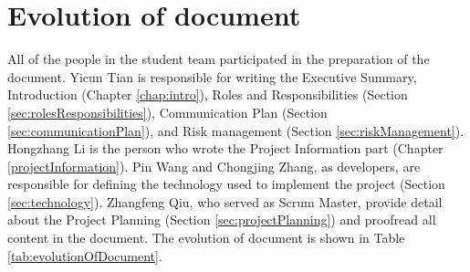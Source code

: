 \section{Evolution of document}
\label{sec:evolutionOfDocument}
All of the people in the student team participated in the preparation of the document. Yicun Tian is responsible for writing the Executive Summary, Introduction (Chapter \ref{chap:intro}), Roles and Responsibilities (Section \ref{sec:rolesResponsibilities}), Communication Plan (Section \ref{sec:communicationPlan}), and Risk management (Section \ref{sec:riskManagement}). Hongzhang Li is the person who wrote the Project Information part (Chapter \ref{projectInformation}). Pin Wang and Chongjing Zhang, as developers, are responsible for defining the technology used to implement the project (Section \ref{sec:technology}). Zhangfeng Qiu, who served as Scrum Master, provide detail about the Project Planning (Section \ref{sec:projectPlanning}) and proofread all content in the document. The evolution of document is shown in Table \ref{tab:evolutionOfDocument}.
\clearpage
